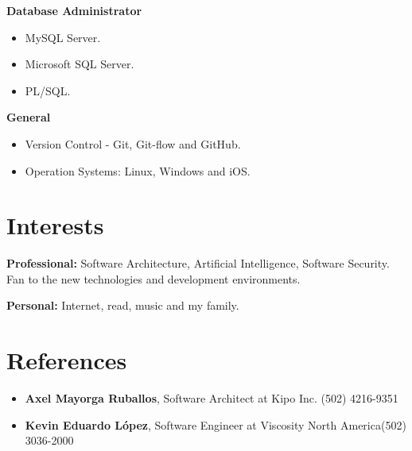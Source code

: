\documentclass[]{friggeri-cv} %
\begin{document}
\textbf{Database Administrator}
\begin{itemize}
	\item MySQL Server.
	\item Microsoft SQL Server.
	\item PL/SQL.
\end{itemize}

\textbf{General}
\begin{itemize}
	\item Version Control - Git, Git-flow and GitHub.
	\item Operation Systems: Linux, Windows and iOS.
\end{itemize}


\section{Interests}

\textbf{Professional:} Software Architecture, Artificial Intelligence, Software Security. Fan to the new technologies and development environments. 

\textbf{Personal:} Internet, read, music and my family.

\section{References}

\begin{itemize}
	\item \noindent \textbf{Axel Mayorga Ruballos},  Software Architect at Kipo Inc. \hfill \hfill (502) 4216-9351
	\item \noindent \textbf{Kevin Eduardo López}, Software Engineer at Viscosity North America\hfill \hfill (502) 3036-2000
\end{itemize}
\end{document}
